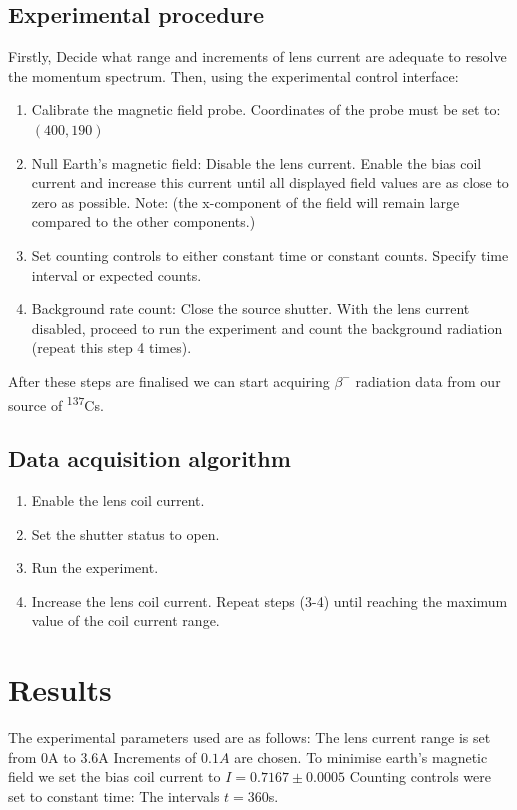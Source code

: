 \documentclass[9pt, a4paper]{article}
\begin{document}
\begin{multicols}{2}
\subsection{Experimental procedure}

Firstly, Decide what range and increments of lens current are adequate to resolve the momentum spectrum.
Then, using the experimental control interface:
\begin{enumerate}
\item Calibrate the magnetic field probe.
    Coordinates of the probe must be set to: $(400,190)$
\item Null Earth's magnetic field:
    Disable the lens current.
    Enable the bias coil current and increase this current until all displayed field values are as close to zero as possible. 
    Note: (the x-component of the field will remain large compared to the other components.)
\item Set counting controls to either constant time or constant counts.
    Specify time interval or expected counts.
\item Background rate count:
    Close the source shutter.
    With the lens current disabled, proceed to run the experiment and count the background radiation (repeat this step 4 times).
\end{enumerate}
After these steps are finalised we can start acquiring $\beta^{-}$ radiation data from our source of \textsuperscript{137}Cs.
\subsection{Data acquisition algorithm}
\begin{enumerate}
\item Enable the lens coil current.    
\item Set the shutter status to open.
\item Run the experiment.
\item Increase the lens coil current.
Repeat steps (3-4) until reaching the maximum value of the coil current range.
\end{enumerate}

\section{Results}

The experimental parameters used are as follows:
The lens current range is set from $0$A to $3.6$A
Increments of $0.1A$ are chosen. 
To minimise earth's magnetic field we set the bias coil current to $I = 0.7167 \pm 0.0005$
Counting controls were set to constant time: The intervals $t = 360$s.


\end{multicols}
\end{document}
